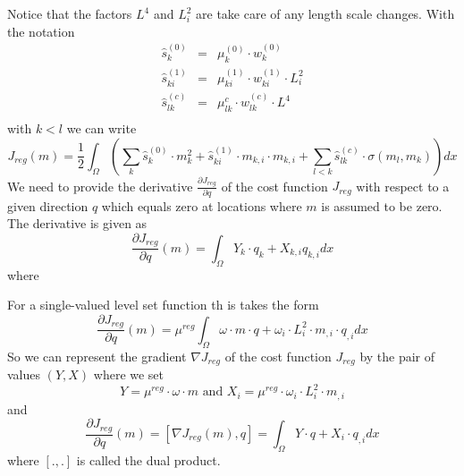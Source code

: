 Notice that the factors $L^4$ and $L_i^2$ are take care of any length scale changes. With the notation
\begin{equation}\label{EQU:REG:2}
\begin{array}{rcl}
\widehat{s}^{(0)}_k & = & \mu^{(0)}_k \cdot w^{(0)}_k \\
\widehat{s}^{(1)}_{ki} & = & \mu^{(1)}_{ki} \cdot w^{(1)}_{ki} \cdot L_i^2  \\
\widehat{s}^{(c)}_{lk} & = & \mu^{c}_{lk} \cdot w^{(c)}_{lk} \cdot L^4  \\
\end{array}
\end{equation} 
with $k<l$ we can write
\begin{equation}\label{EQU:REG:1b}
J_{reg}(m) = \frac{1}{2} \int_{\Omega} \left(
 \sum_{k} \widehat{s}^{(0)}_k \cdot m_k^2 + \widehat{s}^{(1)}_{ki}  \cdot m_{k,i} \cdot m_{k,i}
+  \sum_{l<k} \widehat{s}^{(c)}_{lk} \cdot  \sigma(m_l,m_k) \right) dx 
\end{equation} 
We need to provide the derivative $\frac{ \partial J_{reg}}{\partial q}$  of the cost function $J_{reg}$ with respect to a given direction $q$ which equals zero at locations
where $m$ is assumed to be zero. The derivative is given as 
\begin{equation}\label{EQU:REG:3}
\frac{ \partial J_{reg}}{\partial q}(m) =
 \int_{\Omega} Y_k \cdot q_k + X_{k,i} q_{k,i} dx 
\end{equation} 
where



 For a single-valued 
level set function th is takes the form 
\begin{equation}\label{EQU:REG:3}
\frac{ \partial J_{reg}}{\partial q}(m) =
\mu^{reg} \int_{\Omega} \omega \cdot m \cdot q  + \omega_i \cdot L_i^2 \cdot m_{,i} \cdot q_{,i} dx
\end{equation} 
So we can represent the gradient $\nabla J_{reg}$ of the cost function $J_{reg}$ by the pair of values $(Y,X)$ where we set   
\begin{equation}\label{EQU:REG:3b}
Y=\mu^{reg} \cdot \omega \cdot m \mbox{ and } X_i = \mu^{reg} \cdot \omega_i \cdot L_i^2 \cdot m_{,i}
\end{equation} 
and 
\begin{equation}\label{EQU:REG:3c}
\frac{ \partial J_{reg}}{\partial q}(m) = [ \nabla J_{reg}(m), q ] =
\int_{\Omega} Y  \cdot q  + X_i  \cdot q_{,i} dx
\end{equation} 
where $[.,.]$ is called the dual product.



